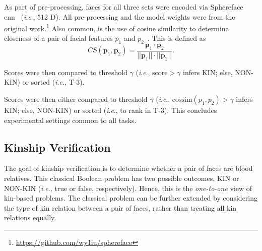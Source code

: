 \documentclass[letterpaper, 10 pt, conference]{ieeeconf}  %
\newcommand{\ie}{\textit{i}.\textit{e}., }
\begin{document}





As part of pre-processing, faces for all three sets were encoded via Sphereface \ac{cnn}~\cite{Liu_2017_CVPR}  (\ie 512 D). All pre-processing and the model weights were from the original work.\footnote{\href{https://github.com/wy1iu/sphereface}{https://github.com/wy1iu/sphereface}} Also common, is the use of cosine similarity to determine closeness of a pair of facial features $p_1$ and $p_2$~\cite{nguyen2010cosine}. This is defined as
$$
CS(\pmb p_1, \pmb p_2) = \frac {\pmb p_1 \cdot \pmb p_2}{||\pmb p_1|| \cdot ||\pmb p_2||}.
$$ 


Scores were then compared to threshold $\gamma$ (\ie $\text{score} > \gamma$ infers KIN; else, NON-KIN) or sorted (\ie T-3).


Scores were then either compared to threshold $\gamma$ (\ie $\text{cossim}(p_1, p_2) > \gamma$ infers KIN; else, NON-KIN) or sorted (\ie to rank in T-3). This concludes experimental settings common to all tasks.



\subsection{Kinship Verification}\label{sec:kinver}

The goal of kinship verification is to determine whether a pair of faces are blood relatives. This classical Boolean problem has two possible outcomes, KIN or NON-KIN (\ie true or false, respectively). Hence, this is the \textit{one-to-one} view of kin-based problems. The classical problem can be further extended by considering the type of kin relation between a pair of faces, rather than treating all kin relations equally.
\end{document}

